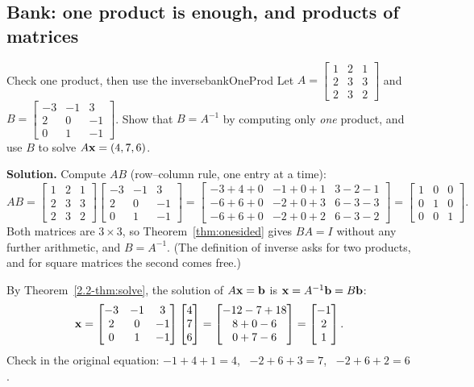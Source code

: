 \documentclass[11pt]{article}
\begin{document}
\subsection*{Bank: one product is enough, and products of matrices}

\begin{exmp}{Check one product, then use the inverse}{bankOneProd}
Let $A=\begin{bmatrix}1&2&1\\2&3&3\\2&3&2\end{bmatrix}$ and $B=\begin{bmatrix}-3&-1&3\\2&0&-1\\0&1&-1\end{bmatrix}$. Show that $B=A^{-1}$ by computing only \emph{one} product, and use $B$ to solve $A\mathbf{x}=(4,7,6)$.

\textbf{Solution.} Compute $AB$ (row--column rule, one entry at a time):
\[
AB=\begin{bmatrix}1&2&1\\2&3&3\\2&3&2\end{bmatrix}\begin{bmatrix}-3&-1&3\\2&0&-1\\0&1&-1\end{bmatrix}
=\begin{bmatrix}-3+4+0&-1+0+1&3-2-1\\-6+6+0&-2+0+3&6-3-3\\-6+6+0&-2+0+2&6-3-2\end{bmatrix}=\begin{bmatrix}1&0&0\\0&1&0\\0&0&1\end{bmatrix}.
\]
Both matrices are $3\times3$, so Theorem~\ref{thm:onesided} gives $BA=I$ without any further arithmetic, and $B=A^{-1}$. (The definition of inverse asks for two products, and for square matrices the second comes free.)

By Theorem~\ref{2.2-thm:solve}, the solution of $A\mathbf{x}=\mathbf{b}$ is $\mathbf{x}=A^{-1}\mathbf{b}=B\mathbf{b}$:
\[
\mathbf{x}=\begin{bmatrix}-3&-1&3\\2&0&-1\\0&1&-1\end{bmatrix}\begin{bmatrix}4\\7\\6\end{bmatrix}=\begin{bmatrix}-12-7+18\\8+0-6\\0+7-6\end{bmatrix}=\begin{bmatrix}-1\\2\\1\end{bmatrix}.
\]
Check in the original equation: $-1+4+1=4$, \ $-2+6+3=7$, \ $-2+6+2=6$.


\end{exmp}
\end{document}
